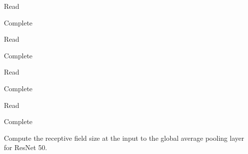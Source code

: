 \documentclass[11pt]{article}
\begin{document}
Read
\begin{solution}
	Complete
\end{solution}

Read
\begin{solution}
	Complete
\end{solution}

Read
\begin{solution}
	Complete
\end{solution}

Read
\begin{solution}
	Complete
\end{solution}

Compute the receptive field size at the input to the global average pooling layer for ResNet 50.
\end{document}
